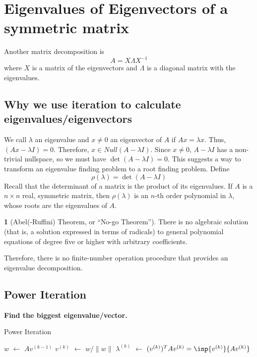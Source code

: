 \documentclass[12pt]{article}
\theoremstyle{definition}
\newtheorem{theorem}{\color{ForestGreen}{\textbf{Theorem}}}
\newcommand{\norm}[1]{\lVert#1\rVert}
\newcommand*\Let[2]{\State #1 $\gets$ #2}
\theoremstyle{definition}
\begin{document}
\section{Eigenvalues of Eigenvectors of a symmetric matrix}

Another matrix decomposition is
\begin{equation}
	A = X \Lambda X^{-1}
\end{equation}
where $X$ is a matrix of the eigenvectors and $\Lambda$ is a diagonal matrix with the eigenvalues. 

\subsection{Why we use iteration to calculate eigenvalues/eigenvectors}
We call $\lambda$ an eigenvalue and $x \neq 0$ an eigenvector of $A$ if $Ax = \lambda x$. Thus, $(Ax - \lambda I) = 0$. Therefore, $x \in Null(A - \lambda I)$. Since $x \neq 0$, $A - \lambda I$ has a non-trivial nullspace, so we must have $\det(A - \lambda I) = 0$. This suggests a way to transform an eigenvalue finding problem to a root finding problem. Define
\begin{equation}
	\rho(\lambda) = \det(A - \lambda I)
\end{equation}
Recall that the determinant of a matrix is the product of its eigenvalues. If $A$ is a $n \times n$ real, symmetric matrix, then $\rho(\lambda)$ is an $n$-th order polynomial in $\lambda$, whose roots are the eigenvalues of $A$. 

\begin{theorem}[Abel(-Ruffini) Theorem, or ``No-go Theorem'']
There is no algebraic solution (that is, a solution expressed in terms of radicals) to general polynomial equations of degree five or higher with arbitrary coefficients.  
\end{theorem}

Therefore, there is no finite-number operation procedure that provides an eigenvalue decomposition. 

\subsection{Power Iteration}
\textbf{Find the biggest eigenvalue/vector.}

\begin{algorithm}[ht]
  \caption{Power Iteration}
  \begin{algorithmic}[1]
    \Require{$v^{(0)} =$ some vector with $\norm{v^{(0)}} = 1$}
	    \Let{$w$}{$Av^{(k-1)}$} 
	    \Let{$v^{(k)}$}{$w/ \norm{w}$} 
	    \Let{$\lambda^{(k)}$}{$(v^{(k)})^T Av^{(k)} = \inp{v^{(k)}}{Av^{(k)}}$} 
    \EndFor
  \end{algorithmic}
\end{algorithm}
\end{document}

